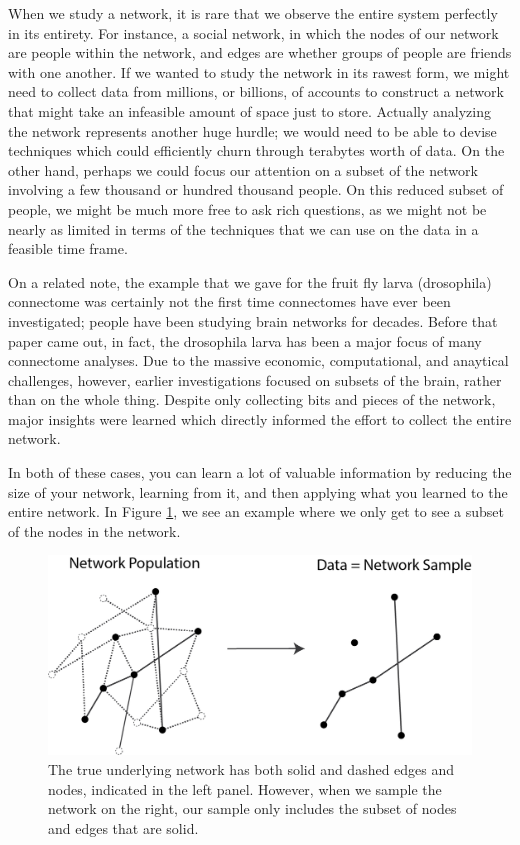 When we study a network, it is rare that we observe the entire system perfectly in its entirety. For instance, a social network, in which the nodes of our network are people within the network, and edges are whether groups of people are friends with one another. If we wanted to study the network in its rawest form, we might need to collect data from millions, or billions, of accounts to construct a network that might take an infeasible amount of space just to store. Actually analyzing the network represents another huge hurdle; we would need to be able to devise techniques which could efficiently churn through terabytes worth of data. On the other hand, perhaps we could focus our attention on a subset of the network involving a few thousand or hundred thousand people. On this reduced subset of people, we might be much more free to ask rich questions, as we might not be nearly as limited in terms of the techniques that we can use on the data in a feasible time frame.

On a related note, the example that we gave for the fruit fly larva (drosophila) connectome was certainly not the first time connectomes have ever been investigated; people have been studying brain networks for decades. Before that paper came out, in fact, the drosophila larva has been a major focus of many connectome analyses. Due to the massive economic, computational, and anaytical challenges, however, earlier investigations focused on subsets of the brain, rather than on the whole thing. Despite only collecting bits and pieces of the network, major insights were learned which directly informed the effort to collect the entire network.

In both of these cases, you can learn a lot of valuable information by reducing the size of your network, learning from it, and then applying what you learned to the entire network. In Figure \ref{fig:ch1:nodes_ss}, we see an example where we only get to see a subset of the nodes in the network.

\begin{figure}[h]
    \centering
    \includegraphics[width=0.8\linewidth]{foundations/ch1/Images/nodes.png}
    \caption[Only see subset of nodes]{The true underlying network has both solid and dashed edges and nodes, indicated in the left panel. However, when we sample the network on the right, our sample only includes the subset of nodes and edges that are solid.}
    \label{fig:ch1:nodes_ss}
\end{figure}


